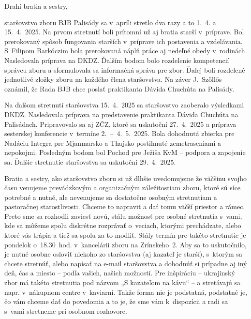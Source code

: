 \def\velkostpisma{10}
\def\velkostriadku{12.5}



Drahí bratia a sestry,

staršovstvo zboru BJB Palisády sa v~apríli stretlo dva razy a to 1.~4. a 15.~4.~2025. Na prvom stretnutí boli prítomní už aj bratia starší v~príprave.
Bol prerokovaný spôsob fungovania starších v~príprave ich postavenia a vzdelávania. S~Filipom Barkóczim bola prerokovaná náplň práce aj nedeľné obedy v~rodinách. Nasledovala príprava na DKDZ. Ďalším bodom bolo rozdelenie kompetencií správcu zboru a sformulovala sa informačná správa pre zbor. Ďalej boli rozdelené jednotlivé zložky zboru na každého člena staršovstva. Na záver J.~Szőllős oznámil, že Rada BJB chce poslať praktikanta Dávida Chuchúta na Palisády.

Na ďalšom stretnutí staršovstva 15.~4.~2025 sa staršovstvo zaoberalo výsledkami DKDZ. Nasledovala príprava na predstavenie praktikanta Dávida Chuchúta na Palisádach. Pripravovalo sa aj ZČZ, ktoré sa uskutoční 27.~4.~2025 a príprava sesterskej konferencie v~termíne 2.~--~4.~5.~2025. Bola dohodnutá zbierka pre Nadáciu Integra pre Mjanmarsko a Thajsko postihnuté zemetraseniami a nepokojmi. Posledným bodom bol Pochod pre Ježiša KvM -- podpora a zapojenie sa. Ďalšie stretnutie staršovstva sa uskutoční 29.~4.~2025.



Bratia a sestry, ako staršovstvo zboru si už dlhšie uvedomujeme že väčšinu svojho času venujeme prevádzkovým a organizačným  záležitostiam zboru, ktoré sú síce potrebné a nutné, ale nevenujeme sa dostatočne osobným stretnutiam a pastoračnej starostlivosti. Chceme to napraviť a dať tomu väčší priestor a rámec. Preto sme sa rozhodli zaviesť novú, stálu možnosť pre osobné stretnutia s~vami, kde sa môžeme spolu diskrétne rozprávať o~veciach, ktorými prechádzate, alebo ktoré vás trápia a tiež sa spolu za to modliť. Stály termín pre takéto stretnutie je pondelok o~18.30~hod. v~kancelárii zboru na Zrínskeho~2. Aby sa to uskutočnilo, je nutné osobne osloviť niekoho zo staršovstva (aj kazateľ je starší), s~ktorým sa chcete stretnúť, alebo napísať na e-mail staršovstva a dohodnúť si prípadne aj iný deň, čas a miesto -- podľa vašich, našich možností. Pre inšpiráciu -- ukrajinský zbor má takéto stretnutia pod názvom  „S kazateľom na kávu“ -- a stretávajú sa napr. v~nákupnom centre v~kaviarni. Takže forma nie je podstatná, podstatné je, čo vám chceme dať do povedomia a to je, že sme vám k~dispozícii a radi sa s~vami stretneme pri osobnom rozhovore.

